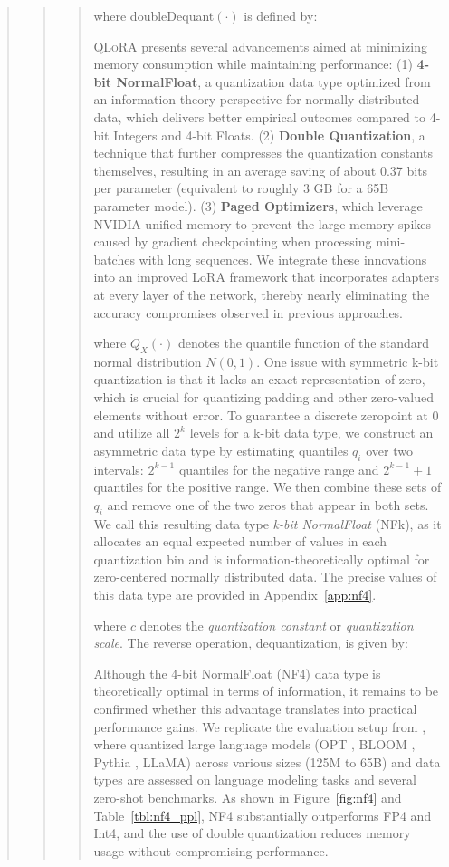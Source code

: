 \begin{quote}
\begin{quote}
\begin{quote}
where doubleDequant$(\cdot)$ is defined by:

\textsc{QLoRA} presents several advancements aimed at minimizing memory consumption while maintaining performance: (1) \textbf{4-bit NormalFloat}, a quantization data type optimized from an information theory perspective for normally distributed data, which delivers better empirical outcomes compared to 4-bit Integers and 4-bit Floats. (2) \textbf{Double Quantization}, a technique that further compresses the quantization constants themselves, resulting in an average saving of about 0.37 bits per parameter (equivalent to roughly 3 GB for a 65B parameter model). (3) \textbf{Paged Optimizers}, which leverage NVIDIA unified memory to prevent the large memory spikes caused by gradient checkpointing when processing mini-batches with long sequences. We integrate these innovations into an improved LoRA framework that incorporates adapters at every layer of the network, thereby nearly eliminating the accuracy compromises observed in previous approaches.

where $Q_X(\cdot)$ denotes the quantile function of the standard normal distribution $N(0,1)$. One issue with symmetric k-bit quantization is that it lacks an exact representation of zero, which is crucial for quantizing padding and other zero-valued elements without error. To guarantee a discrete zeropoint at $0$ and utilize all $2^k$ levels for a k-bit data type, we construct an asymmetric data type by estimating quantiles $q_i$ over two intervals: $2^{k-1}$ quantiles for the negative range and $2^{k-1}+1$ quantiles for the positive range. We then combine these sets of $q_i$ and remove one of the two zeros that appear in both sets. We call this resulting data type \emph{k-bit NormalFloat} (NFk), as it allocates an equal expected number of values in each quantization bin and is information-theoretically optimal for zero-centered normally distributed data. The precise values of this data type are provided in Appendix~\ref{app:nf4}.

where $c$ denotes the {\em quantization constant} or {\em quantization scale}. The reverse operation, dequantization, is given by:

Although the 4-bit NormalFloat (NF4) data type is theoretically optimal in terms of information, it remains to be confirmed whether this advantage translates into practical performance gains. We replicate the evaluation setup from \citet{dettmers2022case}, where quantized large language models (OPT \citep{zhang2022opt}, BLOOM \cite{scao2022bloom}, Pythia \cite{biderman2023pythia}, LLaMA) across various sizes (125M to 65B) and data types are assessed on language modeling tasks and several zero-shot benchmarks. As shown in Figure~\ref{fig:nf4} and Table~\ref{tbl:nf4_ppl}, NF4 substantially outperforms FP4 and Int4, and the use of double quantization reduces memory usage without compromising performance.


\end{quote}
\end{quote}
\end{quote}
